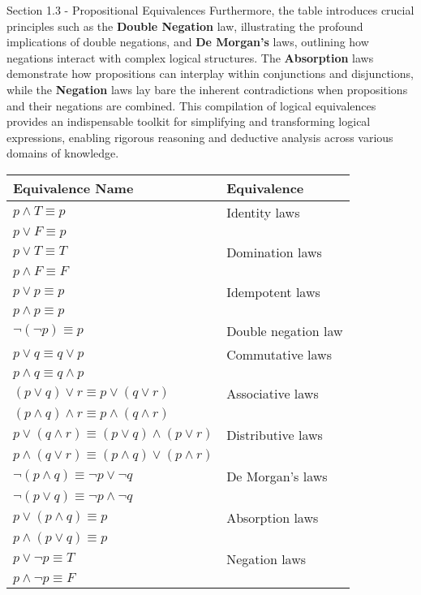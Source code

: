 \begin{notes}{Section 1.3 - Propositional Equivalences}
    Furthermore, the table introduces crucial principles such as the \textbf{Double Negation} law, illustrating the profound implications of double negations, and \textbf{De Morgan's} laws, outlining how negations interact 
    with complex logical structures. The \textbf{Absorption} laws demonstrate how propositions can interplay within conjunctions and disjunctions, while the \textbf{Negation} laws lay bare the inherent contradictions when 
    propositions and their negations are combined. This compilation of logical equivalences provides an indispensable toolkit for simplifying and transforming logical expressions, enabling rigorous reasoning and 
    deductive analysis across various domains of knowledge.
    \begin{center}
        \begin{tabular}{|l|l|}
            \hline Equivalence Name & Equivalence \\ \hline
            $p \land T \equiv p$ & Identity laws \\
            $p \lor F \equiv p$ & \\
            $p \lor T \equiv T$ & Domination laws \\
            $p \land F \equiv F$ & \\
            $p \lor p \equiv p$ & Idempotent laws \\
            $p \land p \equiv p$ & \\
            $\neg (\neg p) \equiv p$ & Double negation law \\
            $p \lor q \equiv q \lor p$ & Commutative laws \\
            $p \land q \equiv q \land p$ & \\
            $(p \lor q) \lor r \equiv p \lor (q \lor r)$ & Associative laws \\
            $(p \land q) \land r \equiv p \land (q \land r)$ & \\
            $p \lor (q \land r) \equiv (p \lor q) \land (p \lor r)$ & Distributive laws \\
            $p \land (q \lor r) \equiv (p \land q) \lor (p \land r)$ & \\
            $\neg (p \land q) \equiv \neg p \lor \neg q$ & De Morgan’s laws \\
            $\neg (p \lor q) \equiv \neg p \land \neg q$ & \\
            $p \lor (p \land q) \equiv p$ & Absorption laws \\
            $p \land (p \lor q) \equiv p$ & \\
            $p \lor \neg p \equiv T$ & Negation laws \\
            $p \land \neg p \equiv F$ & \\ \hline
        \end{tabular}
    \end{center}


\end{notes}
